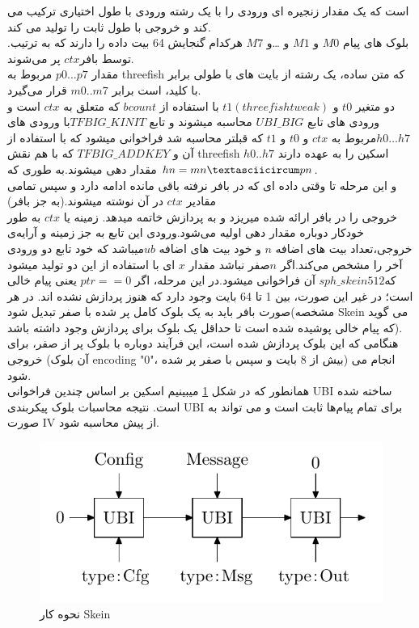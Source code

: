  است که یک مقدار زنجیره ای ورودی را با یک رشته ورودی با طول اختیاری ترکیب می کند و خروجی با طول ثابت را تولید می کند.\\
.بلوک های پیام $M0$ و $M1$ و …و $M7$ هرکدام گنجایش 64 بیت داده را دارند که به ترتیب توسط  بافر$ ctx$ پر می‌شوند.\\
 مقدار $p0…p7$ مربوط به threefish که متن ساده، یک رشته از بایت های با طولی برابر با کلید، است برابر $m0..m7$ قرار می‌گیرد.\\
دو متغیر $t0$ و $t1(threefish tweak)$ با استفاده از $bcount$  که متعلق به $ctx$ است و ورودی های تابع  $UBI\_BIG$ محاسبه میشوند و تابع $TFBIG\_KINIT$با ورودی های $h0 …h7 $مربوط به $ctx$ و $t0$ و $t1$ که قبلتر محاسبه شد فراخوانی میشود که با استفاده از آن و $TFBIG\_ADDKEY$ که با هم نقش  threefish اسکین را به عهده دارند $h0..h7$ مقدار دهی میشوند.به طوری که $hn = mn \textasciicircum pn$.\\
 و این مرحله تا وقتی داده ای که در بافر نرفته باقی  مانده ادامه دارد و سپس تمامی مقادیر $ctx$ در آن نوشته میشوند.(به جز بافر)\\
 خروجی را در بافر ارائه شده میریزد و به پردازش خاتمه میدهد. زمینه یا $ctx$ به طور خودکار دوباره مقدار دهی اولیه می‌شود.ورودی این تابع به جز زمینه و آرایه‌ی خروجی،تعداد بیت های اضافه $n$ و خود بیت های اضافه $ub $میباشد که خود تابع دو ورودی آخر را مشخص می‌کند.اگر $n $صفر نباشد مقدار $x$ ای با استفاده از این دو تولید میشود که$ sph\_skein512$ آن فراخوانی میشود.در این مرحله، اگر $ptr == 0$ یعنی پیام خالی است؛ در غیر این صورت، بین 1 تا 64 بایت وجود دارد که هنوز پردازش نشده اند. در هر صورت بافر باید به یک بلوک کامل پر شده با صفر تبدیل شود(مشخصه Skein می گوید که پیام خالی پوشیده شده است تا حداقل یک بلوک برای پردازش وجود داشته باشد).
  هنگامی که این بلوک پردازش شده است، این فرآیند دوباره با بلوک پر از صفر، برای خروجی (آن بلوک encoding "0"، بیش از 8 بایت و سپس با صفر پر شده) انجام می شود.\\
  همانطور که در شکل 
  \ref{skein_normal_hash}
   میبینیم اسکین بر اساس چندین فراخوانی UBI ساخته شده است.
نتیجه  محاسبات بلوک پیکربندی UBI برای تمام پیام‌ها ثابت است و می تواند به صورت IV از پیش محاسبه شود.
\begin{figure}[H]
\centering
\includegraphics[scale=0.7]{figs/skein_normal_hash.png}
\caption{نحوه کار Skein}
\label{skein_normal_hash}
\end{figure}

